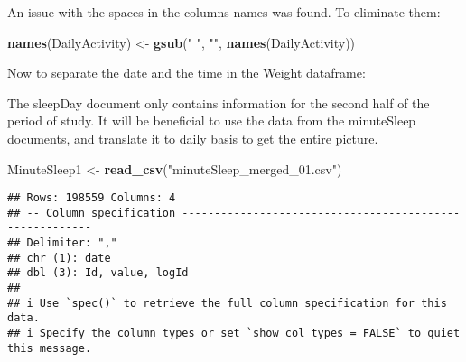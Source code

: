 \documentclass[
]{article}
\newenvironment{Shaded}{\begin{snugshade}}{\end{snugshade}}
\newcommand{\AttributeTok}[1]{\textcolor[rgb]{0.13,0.29,0.53}{#1}}
\newcommand{\FunctionTok}[1]{\textcolor[rgb]{0.13,0.29,0.53}{\textbf{#1}}}
\newcommand{\NormalTok}[1]{#1}
\newcommand{\OtherTok}[1]{\textcolor[rgb]{0.56,0.35,0.01}{#1}}
\newcommand{\SpecialCharTok}[1]{\textcolor[rgb]{0.81,0.36,0.00}{\textbf{#1}}}
\newcommand{\StringTok}[1]{\textcolor[rgb]{0.31,0.60,0.02}{#1}}
\begin{document}
An issue with the spaces in the columns names was found. To eliminate
them:

\begin{Shaded}
\begin{Highlighting}[]
\FunctionTok{names}\NormalTok{(DailyActivity) }\OtherTok{\textless{}{-}} \FunctionTok{gsub}\NormalTok{(}\StringTok{" "}\NormalTok{, }\StringTok{""}\NormalTok{, }\FunctionTok{names}\NormalTok{(DailyActivity))}
\end{Highlighting}
\end{Shaded}

Now to separate the date and the time in the Weight dataframe:

\begin{Shaded}
\end{Shaded}

The sleepDay document only contains information for the second half of
the period of study. It will be beneficial to use the data from the
minuteSleep documents, and translate it to daily basis to get the entire
picture.

\begin{Shaded}
\begin{Highlighting}[]
\NormalTok{MinuteSleep1 }\OtherTok{\textless{}{-}} \FunctionTok{read\_csv}\NormalTok{(}\StringTok{"minuteSleep\_merged\_01.csv"}\NormalTok{)}
\end{Highlighting}
\end{Shaded}

\begin{verbatim}
## Rows: 198559 Columns: 4
## -- Column specification --------------------------------------------------------
## Delimiter: ","
## chr (1): date
## dbl (3): Id, value, logId
## 
## i Use `spec()` to retrieve the full column specification for this data.
## i Specify the column types or set `show_col_types = FALSE` to quiet this message.
\end{verbatim}
\end{document}
